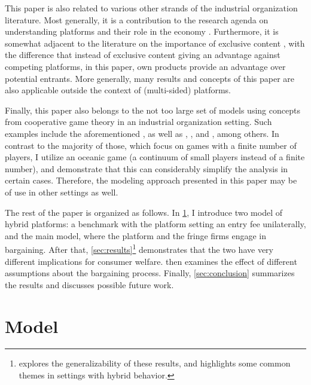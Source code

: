 \documentclass[a4paper]{article}
\begin{document}
This paper is also related to various other strands of the industrial organization literature.
Most generally, it is a contribution to the research agenda on understanding platforms and their role in the economy \parencite[e.g.][]{rochet2003platform,hagiu2004optimal,armstrong2006competition,evans2011platform,lee2014competing}.
Furthermore, it is somewhat adjacent to the literature on the importance of exclusive content \parencite[e.g.][]{hagiu2011exclusivity,lee2013vertical,dou2014sell,weeds2016tv}, with the difference that instead of exclusive content giving an advantage against competing platforms, in this paper, own products provide an advantage over potential entrants.
More generally, many results and concepts of this paper are also applicable outside the context of (multi-sided) platforms.

Finally, this paper also belongs to the not too large set of models using concepts from cooperative game theory in an industrial organization setting.
Such examples include the aforementioned \textcite{montez2007downstream}, as well as \textcite{hart1990property}, \textcite{levy1997individual}, \textcite{inderst2003bargaining} and \textcite{brugemann2019intra}, among others.
In contrast to the majority of those, which focus on games with a finite number of players, I utilize an oceanic game (a continuum of small players instead of a finite number), and demonstrate that this can considerably simplify the analysis in certain cases.
Therefore, the modeling approach presented in this paper may be of use in other settings as well.

The rest of the paper is organized as follows.
In \cref{sec:model}, I introduce two model of hybrid platforms: a benchmark with the platform setting an entry fee unilaterally, and the main model, where the platform and the fringe firms engage in bargaining.
After that, \cref{sec:results}\footnote{
     explores the generalizability of these results, and highlights some common themes in settings with hybrid behavior.
} demonstrates that the two have very different implications for consumer welfare.
 then examines the effect of different assumptions about the bargaining process.
Finally, \cref{sec:conclusion} summarizes the results and discusses possible future work.


\section{Model}
\label{sec:model}
\end{document}
